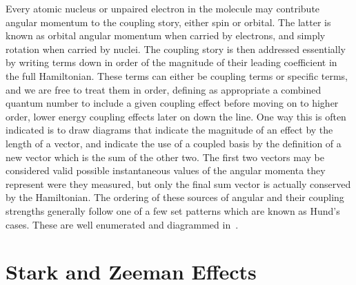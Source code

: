 Every atomic nucleus or unpaired electron in the molecule may contribute angular momentum to the coupling story, either spin or orbital.
The latter is known as orbital angular momentum when carried by electrons, and simply rotation when carried by nuclei.
The coupling story is then addressed essentially by writing terms down in order of the magnitude of their leading coefficient in the full Hamiltonian.
These terms can either be coupling terms or specific terms, and we are free to treat them in order, defining as appropriate a combined quantum number to include a given coupling effect before moving on to higher order, lower energy coupling effects later on down the line.
One way this is often indicated is to draw diagrams that indicate the magnitude of an effect by the length of a vector, and indicate the use of a coupled basis by the definition of a new vector which is the sum of the other two.
The first two vectors may be considered valid possible instantaneous values of the angular momenta they represent were they measured, but only the final sum vector is actually conserved by the Hamiltonian.
The ordering of these sources of angular and their coupling strengths generally follow one of a few set patterns which are known as Hund's cases.
These are well enumerated and diagrammed in~\citep[Sec.~2.2.1-4]{StuhlThesis2012}.

\section{Stark and Zeeman Effects}


